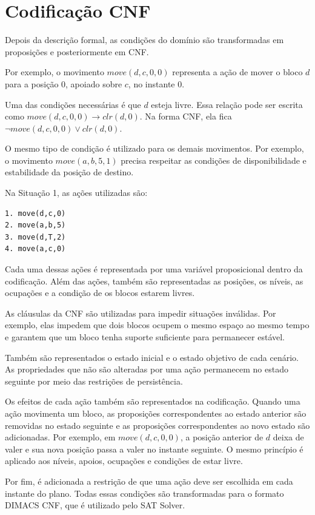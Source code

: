 \documentclass{article}
\begin{document}
\section{Codificação CNF}

Depois da descrição formal, as condições do domínio são transformadas em proposições e posteriormente em CNF.

Por exemplo, o movimento $move(d,c,0,0)$ representa a ação de mover o bloco $d$ para a posição 0, apoiado sobre $c$, no instante 0.

Uma das condições necessárias é que $d$ esteja livre. Essa relação pode ser escrita como $move(d,c,0,0) \rightarrow clr(d,0)$. Na forma CNF, ela fica $\neg move(d,c,0,0) \lor clr(d,0)$.

O mesmo tipo de condição é utilizado para os demais movimentos. Por exemplo, o movimento $move(a,b,5,1)$ precisa respeitar as condições de disponibilidade e estabilidade da posição de destino.

Na Situação 1, as ações utilizadas são:

\begin{verbatim}
1. move(d,c,0)
2. move(a,b,5)
3. move(d,T,2)
4. move(a,c,0)
\end{verbatim}

Cada uma dessas ações é representada por uma variável proposicional dentro da codificação. Além das ações, também são representadas as posições, os níveis, as ocupações e a condição de os blocos estarem livres.

As cláusulas da CNF são utilizadas para impedir situações inválidas. Por exemplo, elas impedem que dois blocos ocupem o mesmo espaço ao mesmo tempo e garantem que um bloco tenha suporte suficiente para permanecer estável.

Também são representados o estado inicial e o estado objetivo de cada cenário. As propriedades que não são alteradas por uma ação permanecem no estado seguinte por meio das restrições de persistência.

Os efeitos de cada ação também são representados na codificação. Quando uma ação movimenta um bloco, as proposições correspondentes ao estado anterior são removidas no estado seguinte e as proposições correspondentes ao novo estado são adicionadas. Por exemplo, em $move(d,c,0,0)$, a posição anterior de $d$ deixa de valer e sua nova posição passa a valer no instante seguinte. O mesmo princípio é aplicado aos níveis, apoios, ocupações e condições de estar livre.

Por fim, é adicionada a restrição de que uma ação deve ser escolhida em cada instante do plano. Todas essas condições são transformadas para o formato DIMACS CNF, que é utilizado pelo SAT Solver.
\end{document}
